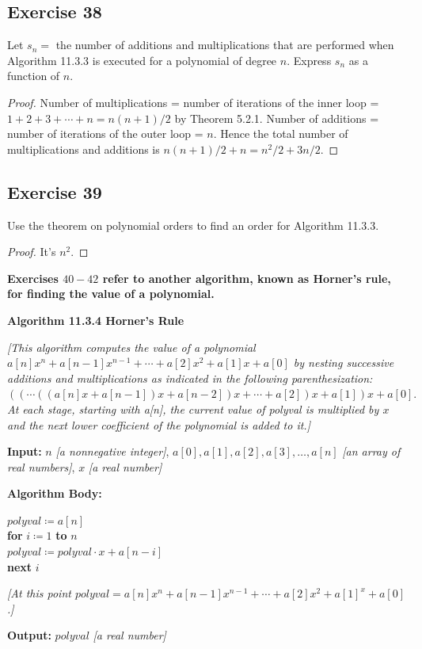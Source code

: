 \documentclass[14pt]{extarticle}
\newcommand{\cy}{\color{cyan}}
\begin{document}
\subsection{Exercise 38}
Let \(s_n =\) the number of additions and multiplications that are performed when Algorithm 11.3.3 is executed for a
polynomial of degree \(n\). Express \(s_n\) as a function of \(n\).

\begin{proof}
    Number of multiplications = number of iterations of the inner loop = \(1 +2+ 3 + \cdots + n = n(n + 1)/2\) by Theorem 5.2.1.
    Number of additions = number of iterations of the outer loop = \(n\). Hence the total number of multiplications and additions
    is \(n(n + 1)/2 + n = n^2/2 + 3n/2\).
\end{proof}

\subsection{Exercise 39}
Use the theorem on polynomial orders to find an order for Algorithm 11.3.3.

\begin{proof}
    It's \(n^2\).
\end{proof}

{\bf \cy Exercises \(40-42\) refer to another algorithm, known as Horner’s rule, for finding the value of a polynomial.}

\begin{tcolorbox}[colframe=cyan]
    {\bf \cy Algorithm 11.3.4 Horner's Rule}

    {\it [This algorithm computes the value of a polynomial \(a[n]x^n + a[n-1]x^{n-1} + \cdots + a[2]x^2 + a[1]x + a[0]\)
    by nesting successive additions and multiplications as indicated in the following parenthesization: \(((\cdots((a[n]x
    + a[n-1])x + a[n-2])x + \cdots + a[2])x + a[1])x + a[0].\) At each stage, starting with a[n], the current value of polyval
    is multiplied by \(x\) and the next lower coefficient of the polynomial is added to it.]}

    {\bf Input:} \(n\) {\it [a nonnegative integer]}, \(a[0], a[1], a[2], a[3], \ldots, a[n]\) {\it [an array of real
                numbers]}, \(x\) {\it [a real number]}

        {\bf Algorithm Body:}
    \begin{tabbing}
        \(polyval \coloneqq a[n]\) \\
        {\bf for} \= \(i \coloneqq 1\) {\bf to} \(n\) \\
        \> \(polyval \coloneqq polyval \cdot x + a[n-i]\) \\
        {\bf next} \(i\)
    \end{tabbing}

    {\it [At this point \(polyval = a[n]x^n + a[n-1]x^{n-1} + \cdots + a[2]x^2 + a[1]^x + a[0]\).]}

    {\bf Output:} \(polyval\) {\it [a real number]}
\end{tcolorbox}
\end{document}
